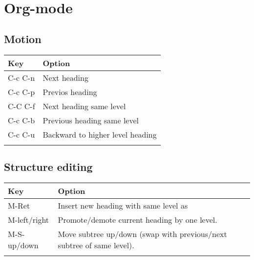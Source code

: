 \documentclass[11pt]{article}
\author{Sank}
\date{\today}
\title{}
\begin{document}
\tableofcontents

\section{Org-mode}
\label{sec:orga6229c6}
\subsection{Motion}
\label{sec:orge37cc40}
\begin{center}
\begin{tabular}{ll}
Key & Option\\
\hline
C-c C-n & Next heading\\
C-c C-p & Previos heading\\
C-C C-f & Next heading same level\\
C-c C-b & Previous heading same level\\
C-c C-u & Backward to higher level heading\\
 & \\
\hline
\end{tabular}
\end{center}

\subsection{Structure editing}
\label{sec:orge63ad76}
\begin{center}
\begin{tabular}{ll}
Key & Option\\
\hline
M-Ret & Insert new heading with same level as\\
M-left/right & Promote/demote current heading by one level.\\
M-S-up/down & Move subtree up/down (swap with previous/next subtree of same level).\\
 & \\
\hline
\end{tabular}
\end{center}
\end{document}
